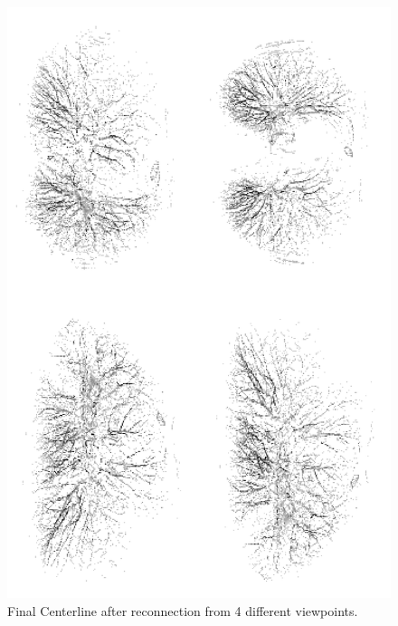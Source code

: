 \begin{figure}[h!]
 \centering
 \includegraphics[width=15cm,keepaspectratio=true]{./figures/centerline-white.png}
 \caption{Final Centerline after reconnection from 4 different viewpoints.}
 \label{fig:centerline}
\end{figure}



%
%

\FloatBarrier\label{end-of-document}



